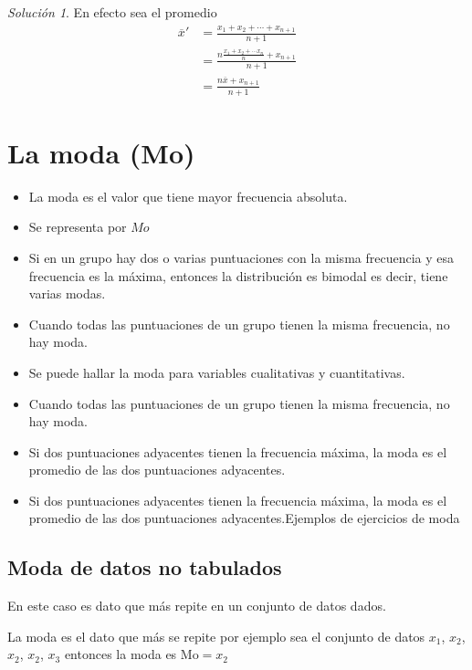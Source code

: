 \documentclass[10pt,]{krantz}
\theoremstyle{definition}
\theoremstyle{definition}
\theoremstyle{definition}
\theoremstyle{definition}
\theoremstyle{remark}
\newtheorem*{solution}{Solución}
\begin{document}
\begin{solution}
{}En efecto sea el promedio
\begin{align*}
\overline{x}'&=\frac{x_1+x_2+\cdots+x_{n+1}}{n+1}\\
&=\frac{n\frac{x_1+x_2+\cdots x_n}{n}+x_{n+1}}{n+1}\\
&=\frac{n\overline{x}+x_{n+1}}{n+1}
\end{align*}
\end{solution}

\hypertarget{la-moda-mo}{%
\section{La moda (Mo)}\label{la-moda-mo}}

\begin{itemize}
\item
  La moda es el valor que tiene mayor frecuencia absoluta.
\item
  Se representa por \(Mo\)
\item
  Si en un grupo hay dos o varias puntuaciones con la misma frecuencia y esa frecuencia es la máxima, entonces la distribución es bimodal es decir, tiene varias modas.
\item
  Cuando todas las puntuaciones de un grupo tienen la misma frecuencia, no hay moda.
\item
  Se puede hallar la moda para variables cualitativas y cuantitativas.
\item
  Cuando todas las puntuaciones de un grupo tienen la misma frecuencia, no hay moda.
\item
  Si dos puntuaciones adyacentes tienen la frecuencia máxima, la moda es el promedio de las dos puntuaciones adyacentes.
\item
  Si dos puntuaciones adyacentes tienen la frecuencia máxima, la moda es el promedio de las dos puntuaciones adyacentes.Ejemplos de ejercicios de moda
\end{itemize}

\hypertarget{moda-de-datos-no-tabulados}{%
\subsection{Moda de datos no tabulados}\label{moda-de-datos-no-tabulados}}

En este caso es dato que más repite en un conjunto de datos dados.

La moda es el dato que más se repite por ejemplo sea el conjunto de datos \(x_1\), \(x_2\), \(x_2\), \(x_2\), \(x_3\) entonces la moda es \(\text{Mo}=x_2\)
\end{document}
